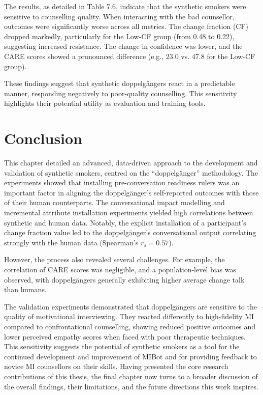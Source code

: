 The results, as detailed in Table 7.6, indicate that the synthetic smokers were sensitive to counselling quality. When interacting with the bad counsellor, outcomes were significantly worse across all metrics. The change fraction (CF) dropped markedly, particularly for the Low-CF group (from 0.48 to 0.22), suggesting increased resistance. The change in confidence was lower, and the CARE scores showed a pronounced difference (e.g., 23.0 vs. 47.8 for the Low-CF group).

These findings suggest that synthetic doppelgängers react in a predictable manner, responding negatively to poor-quality counselling. This sensitivity highlights their potential utility as evaluation and training tools.

\section{Conclusion}

This chapter detailed an advanced, data-driven approach to the development and validation of synthetic smokers, centred on the ``doppelgänger'' methodology. The experiments showed that installing pre-conversation readiness rulers was an important factor in aligning the doppelgänger's self-reported outcomes with those of their human counterparts. The conversational impact modelling and incremental attribute installation experiments yielded high correlations between synthetic and human data. Notably, the explicit installation of a participant's change fraction value led to the doppelgänger's conversational output correlating strongly with the human data (Spearman's $r_{s}=0.57$).

However, the process also revealed several challenges. For example, the correlation of CARE scores was negligible, and a population-level bias was observed, with doppelgängers generally exhibiting higher average change talk than humans.

The validation experiments demonstrated that doppelgängers are sensitive to the quality of motivational interviewing. They reacted differently to high-fidelity MI compared to confrontational counselling, showing reduced positive outcomes and lower perceived empathy scores when faced with poor therapeutic techniques. This sensitivity suggests the potential of synthetic smokers as a tool for the continued development and improvement of MIBot and for providing feedback to novice MI counsellors on their skills. Having presented the core research contributions of this thesis, the final chapter now turns to a broader discussion of the overall findings, their limitations, and the future directions this work inspires.